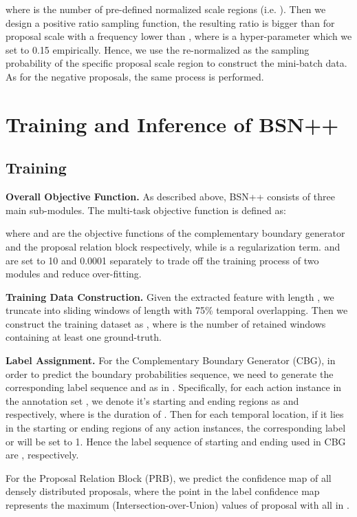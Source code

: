 \documentclass[letterpaper]{article} \usepackage{aaai21}  \usepackage{times}  \usepackage{helvet} \usepackage{courier}  \usepackage[hyphens]{url}  \usepackage{graphicx} \urlstyle{rm} \def\UrlFont{\rm}  \usepackage{natbib}  \usepackage{amsmath,amssymb} \usepackage{caption} \frenchspacing  \usepackage{color}
\begin{document}
where  is the number of pre-defined normalized scale regions (i.e. ). Then we design a positive ratio sampling function, the resulting ratio  is bigger than  for proposal scale with a frequency lower than , where  is a hyper-parameter which we set to 0.15 empirically. Hence, we use the re-normalized  as the sampling probability of the specific proposal scale region  to construct the mini-batch data. As for the negative proposals, the same process is performed.
 
 
\section{Training and Inference of BSN++}



\subsection{Training}
\textbf{Overall Objective Function.} As described above, BSN++ consists of three main sub-modules. The multi-task objective function is defined as:

where  and  are the objective functions of the complementary boundary generator and the proposal relation block respectively, while  is a regularization term.  and  are set to 10 and 0.0001 separately to trade off the training process of two modules and reduce over-fitting. 



\noindent
\textbf{Training Data Construction.} Given the extracted feature  with length , we truncate  into sliding windows of length  with 75\% temporal overlapping. Then we construct the training dataset as , where  is the number of retained windows containing at least one ground-truth. 	

\noindent
\textbf{Label Assignment.} For the Complementary Boundary Generator (CBG), in order to predict the boundary probabilities sequence, we need to generate the corresponding label sequence  and  as in \cite{BSN}. Specifically, for each action instance  in the annotation set , we denote it's starting and ending regions as  and  respectively, where  is the duration of . Then for each temporal location, if it lies in the starting or ending regions of any action instances, the corresponding label  or  will be set to 1. Hence the label sequence of starting and ending used in CBG are ,  respectively. 


For the Proposal Relation Block (PRB), we predict the confidence map  of all densely distributed proposals, where the point  in the label confidence map  represents the maximum  (Intersection-over-Union) values  of proposal  with all  in .
\end{document}
